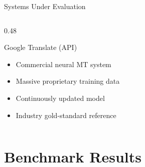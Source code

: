 \documentclass[aspectratio=169]{beamer}
\begin{document}
\begin{frame}{Systems Under Evaluation}
\begin{columns}[T]
\begin{column}{0.48\textwidth}
      \vspace{0.3cm}
      \begin{block}{Google Translate (API)}
        \begin{itemize}
          \item Commercial neural MT system
          \item Massive proprietary training data
          \item Continuously updated model
          \item Industry gold-standard reference
        \end{itemize}
      \end{block}
    \end{column}
  \end{columns}
\end{frame}

\section{Benchmark Results}
\end{document}
